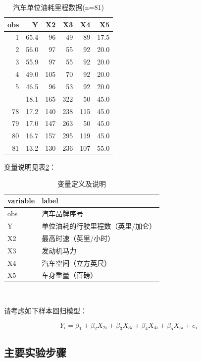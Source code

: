 \documentclass[12pt,(landscape,a4paper),(portrait,a4paper)]{article}
\begin{document}
\begin{table}

\caption{\label{tab:data-car}汽车单位油耗里程数据(n=81)}
\centering
\begin{tabular}[t]{rrrrrr}
\toprule
obs & Y & X2 & X3 & X4 & X5\\
\midrule
1 & 65.4 & 96 & 49 & 89 & 17.5\\
2 & 56.0 & 97 & 55 & 92 & 20.0\\
3 & 55.9 & 97 & 55 & 92 & 20.0\\
4 & 49.0 & 105 & 70 & 92 & 20.0\\
5 & 46.5 & 96 & 53 & 92 & 20.0\\
\addlinespace
77 & 18.1 & 165 & 322 & 50 & 45.0\\
78 & 17.2 & 140 & 238 & 115 & 45.0\\
79 & 17.0 & 147 & 263 & 50 & 45.0\\
80 & 16.7 & 157 & 295 & 119 & 45.0\\
81 & 13.2 & 130 & 236 & 107 & 55.0\\
\bottomrule
\end{tabular}
\end{table}

变量说明见表\ref{tab:label-car}：

\begin{table}

\caption{\label{tab:label-car}变量定义及说明}
\centering
\begin{tabular}[t]{l|l}
\hline
variable & label\\
\hline
obs & 汽车品牌序号\\
\hline
Y & 单位油耗的行驶里程数（英里/加仑）\\
\hline
X2 & 最高时速（英里/小时）\\
\hline
X3 & 发动机马力\\
\hline
X4 & 汽车空间（立方英尺）\\
\hline
X5 & 车身重量（百磅）\\
\hline
\end{tabular}
\end{table}

~

请考虑如下样本回归模型：

\begin{equation}
Y_i=\beta_1+\beta_2X_{2i}+\beta_3X_{3i}+\beta_4X_{4i}+\beta_5X_{5i}+e_{i} \label{eq:M0-car}
\end{equation}

\subsection{主要实验步骤}
\end{document}
